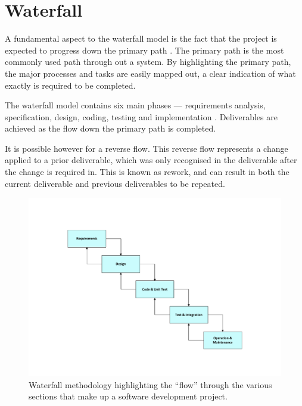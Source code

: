 \section{Waterfall}
A fundamental aspect to the waterfall model is the fact that the project is 
expected to progress down the primary path \citep{sergei:2012:Online}. The 
primary path is the most commonly used path through out a system. By 
highlighting the primary path, the major processes and tasks are easily mapped
out, a clear indication of what exactly is required to be completed.

The waterfall model contains six main phases --- requirements analysis, 
specification, design, coding, testing and implementation \citep{dawson09}. 
Deliverables are achieved as the flow down the primary path is completed. 

It is possible however for a reverse flow. This reverse flow represents a 
change applied to a prior deliverable, which was only recognised in the 
deliverable after the change is required in. This is known as rework, and can 
result in both the current deliverable and previous deliverables to be 
repeated.

\begin{figure}[H]
  \centering
  \vspace{-40pt}
  \includegraphics[width=\linewidth]{chapter6/waterfall.pdf}
  \vspace{-40pt}
    \caption[Waterfall methodology]
      {Waterfall methodology highlighting the ``flow'' through the various 
      sections that make up a software development project.}
\end{figure}

